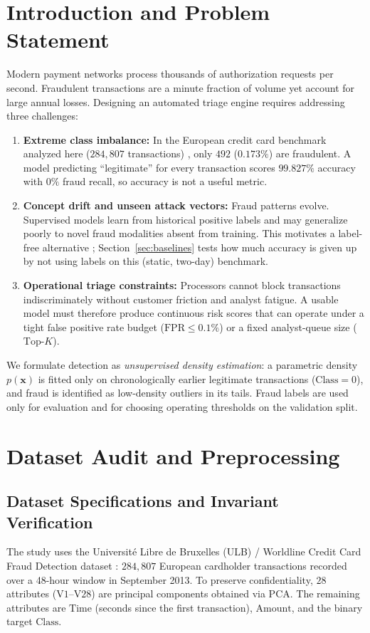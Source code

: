 \documentclass[conference]{IEEEtran}
\begin{document}
\section{Introduction and Problem Statement}

Modern payment networks process thousands of authorization requests per second. Fraudulent transactions are a minute fraction of volume yet account for large annual losses. Designing an automated triage engine requires addressing three challenges:

\begin{enumerate}
    \item \textbf{Extreme class imbalance:} In the European credit card benchmark analyzed here ($284{,}807$ transactions) \cite{dalpozzolo2015}, only $492$ ($0.173\%$) are fraudulent. A model predicting ``legitimate'' for every transaction scores $99.827\%$ accuracy with $0\%$ fraud recall, so accuracy is not a useful metric.
    \item \textbf{Concept drift and unseen attack vectors:} Fraud patterns evolve. Supervised models learn from historical positive labels and may generalize poorly to novel fraud modalities absent from training. This motivates a label-free alternative \cite{chandola2009}; Section~\ref{sec:baselines} tests how much accuracy is given up by not using labels on this (static, two-day) benchmark.
    \item \textbf{Operational triage constraints:} Processors cannot block transactions indiscriminately without customer friction and analyst fatigue. A usable model must therefore produce continuous risk scores that can operate under a tight false positive rate budget ($\text{FPR} \le 0.1\%$) or a fixed analyst-queue size ($\text{Top-}K$).
\end{enumerate}

We formulate detection as \emph{unsupervised density estimation}: a parametric density $p(\mathbf{x})$ is fitted only on chronologically earlier legitimate transactions ($\text{Class} = 0$), and fraud is identified as low-density outliers in its tails. Fraud labels are used only for evaluation and for choosing operating thresholds on the validation split.

\section{Dataset Audit and Preprocessing}

\subsection{Dataset Specifications and Invariant Verification}
The study uses the Universit\'e Libre de Bruxelles (ULB) / Worldline Credit Card Fraud Detection dataset \cite{dalpozzolo2015}: $284{,}807$ European cardholder transactions recorded over a 48-hour window in September 2013. To preserve confidentiality, $28$ attributes ($\text{V1}$--$\text{V28}$) are principal components obtained via PCA. The remaining attributes are $\text{Time}$ (seconds since the first transaction), $\text{Amount}$, and the binary target $\text{Class}$.
\end{document}

